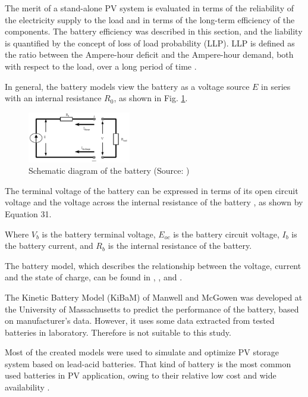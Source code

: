 \documentclass[journal]{IEEEtran}
\begin{document}
The merit of a stand-alone PV system is evaluated in terms of the reliability of the electricity supply to the load and in terms of the long-term efficiency of the components. The battery efficiency was described in this section, and the liability is quantified by the concept of loss of load probability (LLP). LLP is defined as the ratio between the Ampere-hour deficit and the Ampere-hour demand, both with respect to the load, over a long period of time \cite{Copetti}. 

In general, the battery models view the battery as a voltage source $ E $ in series with an internal resistance $ R_{0} $, as shown in Fig. \ref{fig:batteryckt}. 

\begin{figure}[h]
\includegraphics[width=0.4\textwidth]{batteryckt}
\centering
\caption{Schematic diagram of the battery (Source: \cite{Hansen})}
\label{fig:batteryckt}
\end{figure}


The terminal voltage of the battery can be expressed in terms of its open circuit voltage and the voltage across the internal resistance of the battery \cite{Sukamongkol}, as shown by Equation 31.  

Where $ V_{b} $ is the battery terminal voltage, $ E_{oc} $ is the battery circuit voltage, $ I_{b} $ is the battery current, and $ R_{b} $ is the internal resistance of the battery.

The battery model, which describes the relationship between the voltage, current and the state of charge, can be found in \cite{Copetti}, \cite{Manwell93}, and \cite{Manwell94}.  

The Kinetic Battery Model (KiBaM) of Manwell and McGowen \cite{Manwell93} was developed at the University of Massachusetts to predict the performance of the battery, based on manufacturer's data. However, it uses some data extracted from tested batteries in laboratory. Therefore is not suitable to this study. 

Most of the created models were used to simulate and optimize PV storage system based on lead-acid batteries. That kind of battery is the most common used batteries in PV application, owing to their relative low cost and wide availability \cite{Copetti}. 
\end{document}
